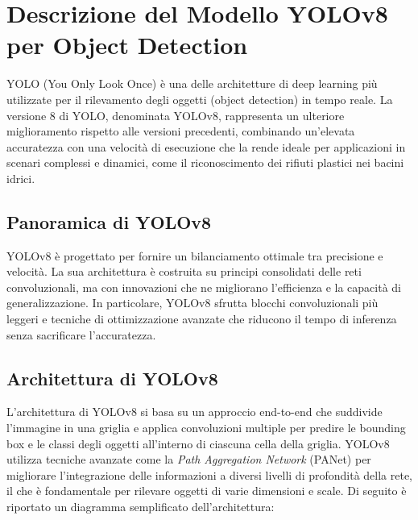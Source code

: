 \section{Descrizione del Modello YOLOv8 per Object Detection}

YOLO (You Only Look Once) è una delle architetture di deep learning più utilizzate per il rilevamento degli oggetti (object detection) in tempo reale. La versione 8 di YOLO, denominata YOLOv8, rappresenta un ulteriore miglioramento rispetto alle versioni precedenti, combinando un'elevata accuratezza con una velocità di esecuzione che la rende ideale per applicazioni in scenari complessi e dinamici, come il riconoscimento dei rifiuti plastici nei bacini idrici.

\subsection{Panoramica di YOLOv8}

YOLOv8 è progettato per fornire un bilanciamento ottimale tra precisione e velocità. La sua architettura è costruita su principi consolidati delle reti convoluzionali, ma con innovazioni che ne migliorano l'efficienza e la capacità di generalizzazione. In particolare, YOLOv8 sfrutta blocchi convoluzionali più leggeri e tecniche di ottimizzazione avanzate che riducono il tempo di inferenza senza sacrificare l'accuratezza.

\subsection{Architettura di YOLOv8}

L'architettura di YOLOv8 si basa su un approccio end-to-end che suddivide l'immagine in una griglia e applica convoluzioni multiple per predire le bounding box e le classi degli oggetti all'interno di ciascuna cella della griglia. YOLOv8 utilizza tecniche avanzate come la \textit{Path Aggregation Network} (PANet) per migliorare l'integrazione delle informazioni a diversi livelli di profondità della rete, il che è fondamentale per rilevare oggetti di varie dimensioni e scale. Di seguito è riportato un diagramma semplificato dell'architettura:

